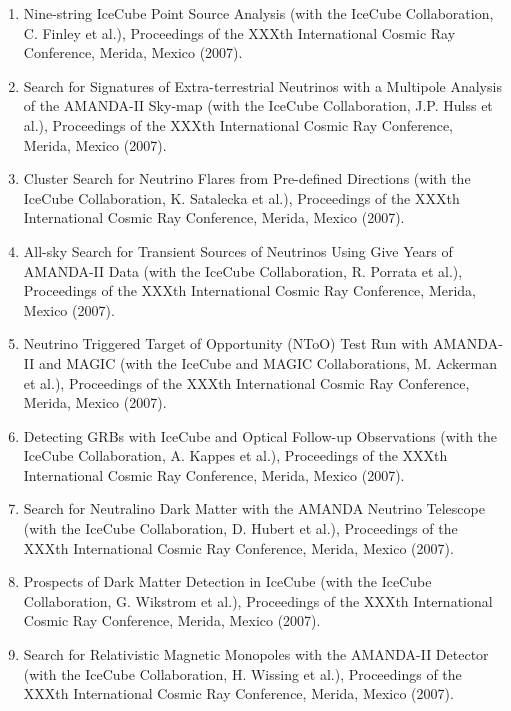 \begin{enumerate}
\item Nine-string IceCube Point Source Analysis (with the IceCube
  Collaboration, C. Finley et al.), Proceedings of the XXXth
  International Cosmic Ray Conference, Merida, Mexico (2007).

\item Search for Signatures of Extra-terrestrial Neutrinos with a
  Multipole Analysis of the AMANDA-II Sky-map (with the IceCube
  Collaboration, J.P. Hulss et al.), Proceedings of the XXXth
  International Cosmic Ray Conference, Merida, Mexico (2007).

\item Cluster Search for Neutrino Flares from Pre-defined Directions
  (with the IceCube Collaboration, K. Satalecka et al.), Proceedings
  of the XXXth International Cosmic Ray Conference, Merida, Mexico
  (2007).

\item All-sky Search for Transient Sources of Neutrinos Using Give
  Years of AMANDA-II Data (with the IceCube Collaboration, R. Porrata
  et al.), Proceedings of the XXXth International Cosmic Ray
  Conference, Merida, Mexico (2007).

\item Neutrino Triggered Target of Opportunity (NToO) Test Run with
  AMANDA-II and MAGIC (with the IceCube and MAGIC Collaborations,
  M. Ackerman et al.), Proceedings of the XXXth International Cosmic
  Ray Conference, Merida, Mexico (2007).

\item Detecting GRBs with IceCube and Optical Follow-up Observations
  (with the IceCube Collaboration, A. Kappes et al.), Proceedings of
  the XXXth International Cosmic Ray Conference, Merida, Mexico
  (2007).

\item Search for Neutralino Dark Matter with the AMANDA Neutrino
  Telescope (with the IceCube Collaboration, D. Hubert et al.),
  Proceedings of the XXXth International Cosmic Ray Conference,
  Merida, Mexico (2007).

\item Prospects of Dark Matter Detection in IceCube (with the IceCube
  Collaboration, G. Wikstrom et al.), Proceedings of the XXXth
  International Cosmic Ray Conference, Merida, Mexico (2007).

\item Search for Relativistic Magnetic Monopoles with the AMANDA-II
  Detector (with the IceCube Collaboration, H. Wissing et al.),
  Proceedings of the XXXth International Cosmic Ray Conference,
  Merida, Mexico (2007).


\end{enumerate}
